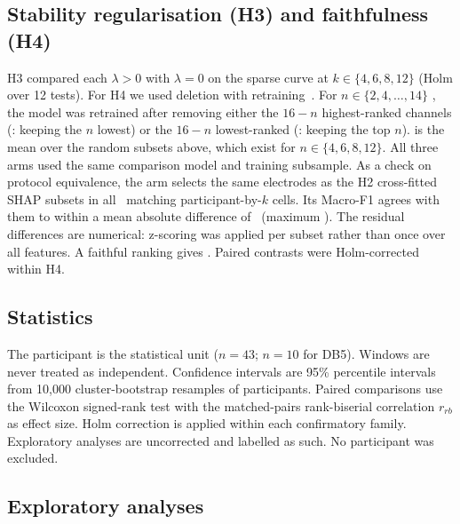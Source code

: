 \subsection{Stability regularisation (H3) and faithfulness (H4)}
H3 compared each $\lambda > 0$ with $\lambda = 0$ on the sparse curve at $k \in \{4, 6, 8, 12\}$ (Holm over 12 tests). For H4 we used deletion with retraining~\cite{hooker2019benchmark}. For $n \in \{2, 4, \ldots, 14\}$ , the model was retrained after removing either the $16 - n$ highest-ranked channels (: keeping the $n$ lowest) or the $16 - n$ lowest-ranked (: keeping the top $n$).  is the mean over the random subsets above, which exist for $n \in \{4, 6, 8, 12\}$. All three arms used the same comparison model and training subsample. As a check on protocol equivalence, the  arm selects the same electrodes as the H2 cross-fitted SHAP subsets in all \FaithProtocolCells\ matching participant-by-$k$ cells. Its Macro-F1 agrees with them to within a mean absolute difference of \FaithProtocolMeanDiff\ (maximum \FaithProtocolMaxDiff). The residual differences are numerical: z-scoring was applied per subset rather than once over all features. A faithful ranking gives . Paired contrasts were Holm-corrected within H4.

\subsection{Statistics}
The participant is the statistical unit ($n = 43$; $n = 10$ for DB5). Windows are never treated as independent. Confidence intervals are 95\% percentile intervals from 10,000 cluster-bootstrap resamples of participants. Paired comparisons use the Wilcoxon signed-rank test with the matched-pairs rank-biserial correlation $r_{rb}$ as effect size. Holm correction is applied within each confirmatory family. Exploratory analyses are uncorrected and labelled as such.  No participant was excluded.

\subsection{Exploratory analyses}

